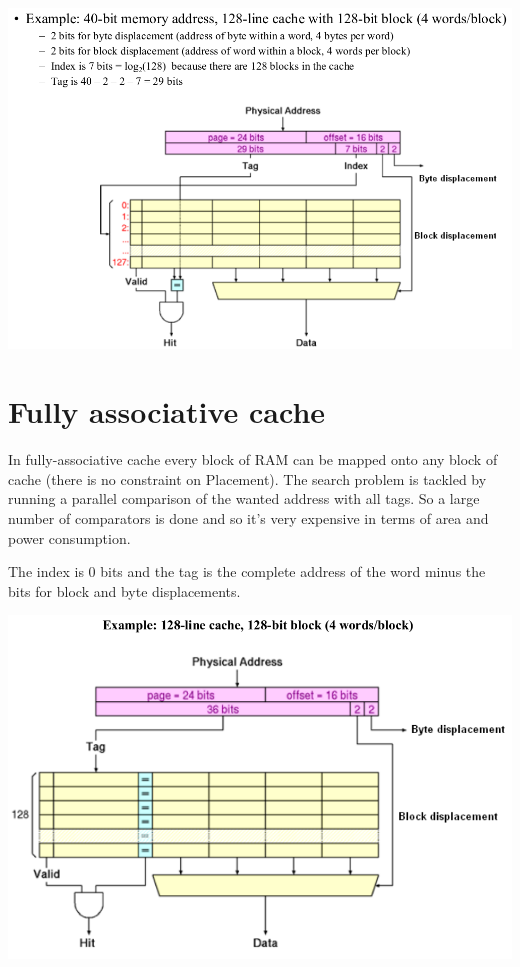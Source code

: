 \includegraphics[width=\textwidth]{images/direct_mapped_cache_example.png}

\section{Fully associative cache}
In fully-associative cache every block of RAM can be mapped onto any block of cache (there is no constraint on Placement).
The search problem is tackled by running a parallel comparison of  the wanted address with all tags. So a large number of comparators is done and so it's very expensive in terms of area and power consumption.

The index is 0 bits and the tag is the complete address of the word minus the bits for block and byte displacements. 

\includegraphics[width=\textwidth]{images/fully_associative_cache.png}

